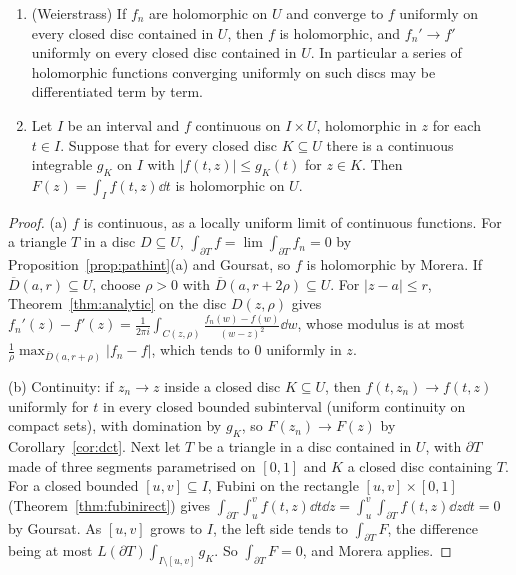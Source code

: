 \begin{theorem}\label{thm:holoparam}
\begin{enumerate}[label=(\alph*)]
\item (Weierstrass) If $f_n$ are holomorphic on $U$ and converge to $f$ uniformly on every closed disc contained in $U$, then $f$ is
holomorphic, and $f_n'\to f'$ uniformly on every closed disc contained in $U$. In particular a series of holomorphic functions converging
uniformly on such discs may be differentiated term by term.
\item Let $I$ be an interval and $f$ continuous on $I\times U$, holomorphic in $z$ for each $t\in I$. Suppose that for every closed disc
$K\subseteq U$ there is a continuous integrable $g_K$ on $I$ with $|f(t,z)|\le g_K(t)$ for $z\in K$. Then $F(z)=\int_If(t,z)\dd t$ is holomorphic on $U$.
\end{enumerate}
\end{theorem}
\begin{proof}
(a) $f$ is continuous, as a locally uniform limit of continuous functions. For a triangle $T$ in a disc $D\subseteq U$, $\int_{\partial T}f=\lim\int_{\partial T}f_n=0$ by
Proposition~\ref{prop:pathint}(a) and Goursat, so $f$ is holomorphic by Morera. If $\overline D(a,r)\subseteq U$, choose $\rho>0$ with $\overline D(a,r+2\rho)\subseteq U$. For
$|z-a|\le r$, Theorem~\ref{thm:analytic} on the disc $D(z,\rho)$ gives $f_n'(z)-f'(z)=\frac1{2\pi i}\int_{C(z,\rho)}\frac{f_n(w)-f(w)}{(w-z)^2}\dd w$, whose modulus is at most
$\frac1\rho\max_{\overline D(a,r+\rho)}|f_n-f|$, which tends to $0$ uniformly in $z$.

(b) Continuity: if $z_n\to z$ inside a closed disc $K\subseteq U$, then $f(t,z_n)\to f(t,z)$ uniformly for $t$ in every closed bounded subinterval
(uniform continuity on compact sets), with domination by $g_K$, so $F(z_n)\to F(z)$ by Corollary~\ref{cor:dct}. Next let $T$ be a triangle in a disc
contained in $U$, with $\partial T$ made of three segments parametrised on $[0,1]$ and $K$ a closed disc containing $T$. For a closed bounded
$[u,v]\subseteq I$, Fubini on the rectangle $[u,v]\times[0,1]$ (Theorem~\ref{thm:fubinirect}) gives $\int_{\partial T}\int_u^vf(t,z)\dd t\dd z=\int_u^v\int_{\partial T}f(t,z)\dd z\dd t=0$ by
Goursat. As $[u,v]$ grows to $I$, the left side tends to $\int_{\partial T}F$, the difference being at most $L(\partial T)\int_{I\setminus[u,v]}g_K$. So $\int_{\partial T}F=0$,
and Morera applies.
\end{proof}

